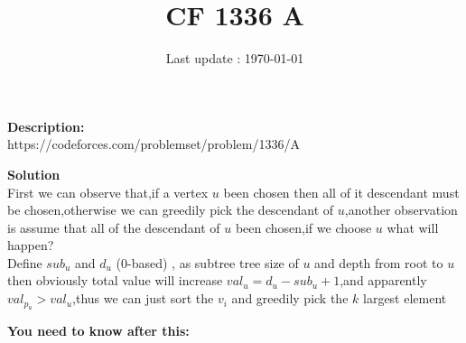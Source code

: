 \documentclass{article}
\begin{document}
\title{\textbf{CF 1336 A}}
\author{}
\date{Last update : \today}

\maketitle

\noindent \textbf{Description:}\\
https://codeforces.com/problemset/problem/1336/A

\noindent \textbf{Solution}\\
First we can observe that,if a vertex $u$ been chosen then all of it descendant must be chosen,otherwise we can greedily pick the descendant of $u$,another observation is assume that all of the descendant of $u$ been chosen,if we choose $u$ what will happen?\\
Define $sub_u$ and $d_u$ (0-based) , as subtree tree size of $u$ and depth from root to $u$ then obviously total value will increase $val_u=d_u-sub_u+1$,and apparently $val_{p_u}>val_{u}$,thus we can just sort the $v_i$ and greedily pick the $k$ largest element

\noindent \textbf{You need to know after this:}\\
\end{document}
